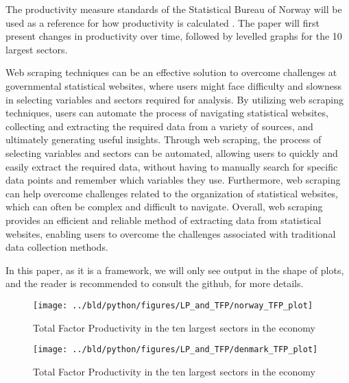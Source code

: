 \documentclass[11pt, a4paper, leqno]{article}
\begin{document}
The productivity measure standards of the Statistical Bureau of Norway will be used as a 
reference for how productivity is calculated \cite{ssb_norway}. The paper will first present 
changes in productivity over time, followed by levelled graphs for the 10 largest sectors.

Web scraping techniques can be an effective solution to overcome challenges at governmental statistical 
websites, where users might face difficulty and slowness in selecting variables and sectors required for analysis. By 
utilizing web scraping techniques, users can automate the process of navigating statistical websites, 
collecting and extracting the required data from a variety of sources, and ultimately generating useful
insights. Through web scraping, the process of selecting variables and sectors can be automated, 
allowing users to quickly and easily extract the required data, without having to manually search for 
specific data points and remember which variables they use. Furthermore, web scraping can help overcome challenges related to the organization 
of statistical websites, which can often be complex and difficult to navigate. Overall, web scraping provides 
an efficient and reliable method of extracting data from statistical websites, enabling users to overcome 
the challenges associated with traditional data collection methods.

In this paper, as it is a framework, we will only see output in the shape of plots, and the reader is recommended to 
consult the github, for more details.


\begin{figure}[H]

    \centering
    \texttt{[image: ../bld/python/figures/LP\_and\_TFP/norway\_TFP\_plot]}

    \caption{Total Factor Productivity in the ten largest sectors in the economy}
    \label{fig:python-predictions}

\end{figure}

\begin{figure}[H]

    \centering
    \texttt{[image: ../bld/python/figures/LP\_and\_TFP/denmark\_TFP\_plot]}

    \caption{Total Factor Productivity in the ten largest sectors in the economy}
    \label{fig:python-predictions}

\end{figure}
\end{document}
